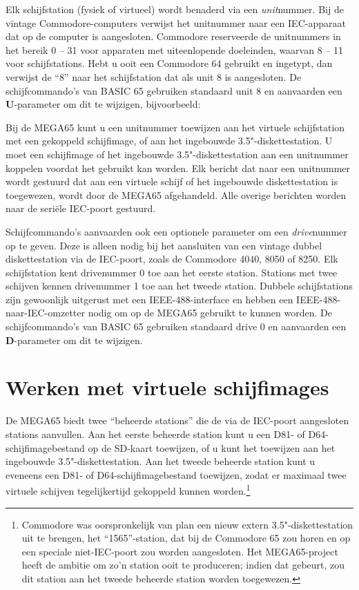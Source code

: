 Elk schijfstation (fysiek of virtueel) wordt benaderd via een {\it unit}nummer. Bij de vintage Commodore-computers verwijst het unitnummer naar een IEC-apparaat dat op de computer is aangesloten. Commodore reserveerde de unitnummers in het bereik 0 -- 31 voor apparaten met uiteenlopende doeleinden, waarvan 8 -- 11 voor schijfstations. Hebt u ooit een Commodore 64 gebruikt en  ingetypt, dan verwijst de ``8'' naar het schijfstation dat als unit 8 is aangesloten. De schijfcommando's van BASIC 65 gebruiken standaard unit 8 en aanvaarden een {\bf U}-parameter om dit te wijzigen, bijvoorbeeld: 

Bij de MEGA65 kunt u een unitnummer toewijzen aan het virtuele schijfstation met een gekoppeld schijfimage, of aan het ingebouwde 3.5"-diskettestation. U moet een schijfimage of het ingebouwde 3.5"-diskettestation aan een unitnummer koppelen voordat het gebruikt kan worden. Elk bericht dat naar een unitnummer wordt gestuurd dat aan een virtuele schijf of het ingebouwde diskettestation is toegewezen, wordt door de MEGA65 afgehandeld. Alle overige berichten worden naar de seriële IEC-poort gestuurd.

Schijfcommando's aanvaarden ook een optionele parameter om een {\it drive}nummer op te geven. Deze is alleen nodig bij het aansluiten van een vintage dubbel diskettestation via de IEC-poort, zoals de Commodore 4040, 8050 of 8250. Elk schijfstation kent drivenummer 0 toe aan het eerste station. Stations met twee schijven kennen drivenummer 1 toe aan het tweede station. Dubbele schijfstations zijn gewoonlijk uitgerust met een IEEE-488-interface en hebben een IEEE-488-naar-IEC-omzetter nodig om op de MEGA65 gebruikt te kunnen worden. De schijfcommando's van BASIC 65 gebruiken standaard drive 0 en aanvaarden een {\bf D}-parameter om dit te wijzigen.


\section{Werken met virtuele schijfimages}

De MEGA65 biedt twee ``beheerde stations'' die de via de IEC-poort aangesloten stations aanvullen. Aan het eerste beheerde station kunt u een D81- of D64-schijfimagebestand op de SD-kaart toewijzen, of u kunt het toewijzen aan het ingebouwde 3.5"-diskettestation. Aan het tweede beheerde station kunt u eveneens een D81- of D64-schijfimagebestand toewijzen, zodat er maximaal twee virtuele schijven tegelijkertijd gekoppeld kunnen worden.\footnote{Commodore was oorspronkelijk van plan een nieuw extern 3.5"-diskettestation uit te brengen, het ``1565''-station, dat bij de Commodore 65 zou horen en op een speciale niet-IEC-poort zou worden aangesloten. Het MEGA65-project heeft de ambitie om zo'n station ooit te produceren; indien dat gebeurt, zou dit station aan het tweede beheerde station worden toegewezen.}

